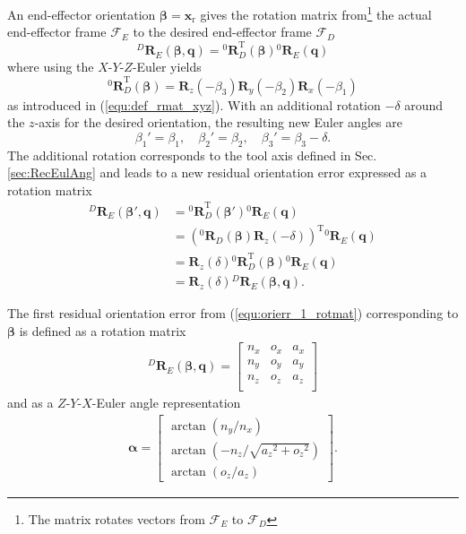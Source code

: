 \documentclass[twocolumn,10pt]{IFTOMM}
\newcommand{\bm}[1]{\boldsymbol{#1}}
\newcommand{\rotmat}[2]{{{ }^{#1}\boldsymbol{R}}_{#2}}
\newcommand{\transp}[0]{{\mathrm{T}}}
\newcommand{\ks}[1]{{\mathcal{F}}_{#1}}
\begin{document}
An end-effector orientation $\bm{\beta}=\bm{x}_{\mathrm{r}}$ gives the rotation matrix from\footnote{The matrix rotates vectors from $\ks{E}$ to $\ks{D}$} the actual end-effector frame $\ks{E}$ to the desired end-effector frame $\ks{D}$
%
\begin{equation}
\rotmat{D}{E}(\bm{\beta},\bm{q})
= 
\rotmat{0}{D}^\transp (\bm{\beta})\rotmat{0}{E}(\bm{q})
\label{equ:orierr_1_rotmat}
\end{equation}
%
where using the $X$-$Y$-$Z$-Euler yields
%
\begin{equation}
\rotmat{0}{D}^\transp(\bm{\beta})
=
\bm{R}_z(-\beta_3) \bm{R}_y(-\beta_2) \bm{R}_x(-\beta_1)
\end{equation}
%
as introduced in (\ref{equ:def_rmat_xyz}).
With an additional rotation $-\delta$ around the $z$-axis for the desired orientation, the resulting new Euler angles are
%
\begin{equation}
\beta_1'=\beta_1,  \quad \beta_2'=\beta_2,  \quad \beta_3'=\beta_3-\delta.
\end{equation}
%
The additional rotation corresponds to the tool axis defined in Sec.\,\ref{sec:RecEulAng} %
and leads to a new residual orientation error expressed as a rotation matrix
%
\begin{align}
\rotmat{D}{E}(\bm{\beta}',\bm{q})
&=
\rotmat{0}{D}^\transp (\bm{\beta}') \rotmat{0}{E}(\bm{q}) \nonumber\\
&=
\left(\rotmat{0}{D}(\bm{\beta})\bm{R}_z(-\delta)\right)^\transp \rotmat{0}{E}(\bm{q}) \nonumber \\
&=
\bm{R}_z(\delta) \rotmat{0}{D}^\transp (\bm{\beta}) \rotmat{0}{E}(\bm{q}) \nonumber \\
&=
\bm{R}_z(\delta) \rotmat{D}{E}(\bm{\beta},\bm{q}).
\label{equ:orierr_2_rotmat}
\end{align}

The first residual orientation error from (\ref{equ:orierr_1_rotmat}) corresponding to $\bm{\beta}$ is defined as a rotation matrix
%
\begin{align}
\rotmat{D}{E}(\bm{\beta},\bm{q})
=
\begin{bmatrix}
{n_x}&{o_x}&{a_x} \\
{n_y}&{o_y}&{a_y} \\ 
{n_z}&{o_z}&{a_z} \\ 
\end{bmatrix}
\label{equ:orierr_1_rotmat_def}
\end{align}
%
and as a $Z$-$Y$-$X$-Euler angle representation
%
\begin{align}
\bm{\alpha} =
\begin{bmatrix}
\arctan \left( {n_y} / { n_x} \right) \\ 
\arctan \left( -{n_z} / \sqrt {{{a_z}}^{2}+{{ o_z}}^{2}} \right) \\ 
\arctan \left( {o_z} / {a_z} \right)
\end{bmatrix}.
\label{equ:alpha_xyz}
\end{align}
\end{document}
